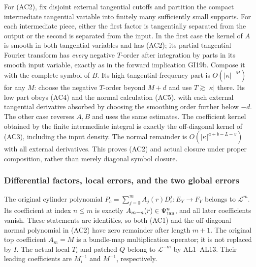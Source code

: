 \documentclass[
  11pt,
]{article}
\begin{document}
For (AC2), fix disjoint external tangential cutoffs and partition the
compact intermediate tangential variable into finitely many sufficiently
small supports. For each intermediate piece, either the first factor is
tangentially separated from the output or the second is separated from
the input. In the first case the kernel of \(A\) is smooth in both
tangential variables and has (AC2); its partial tangential Fourier
transform has \emph{every} negative \(T\)-order after integration by
parts in its smooth input variable, exactly as in the forward
implication GI19b. Compose it with the complete symbol of \(B\). Its
high tangential-frequency part is \(O(|\kappa|^{-M})\) for any \(M\):
choose the negative \(T\)-order beyond \(M+d\) and use
\(T\gtrsim|\kappa|\) there. Its low part obeys (AC4) and the normal
calculation (AC5), with each external tangential derivative absorbed by
choosing the smoothing order further below \(-d\). The other case
reverses \(A,B\) and uses the same estimates. The coefficient kernel
obtained by the finite intermediate integral is exactly the off-diagonal
kernel of (AC3), including the input density. The normal remainder is
\(O(|\kappa|^{a+b-L-v})\) with all external derivatives. This proves
(AC2) and actual closure under proper composition, rather than merely
diagonal symbol closure.

\subsubsection{Differential factors, local errors, and the two global
errors}\label{differential-factors-local-errors-and-the-two-global-errors}

The original cylinder polynomial
\(P_c=\sum_{j=0}^mA_j(r)D_r^j:E_Y\to F_Y\) belongs to \(\mathcal L^m\).
Its coefficient at index \(n\leq m\) is exactly
\(A_{m-n}(r)\in\Psi_{\rm tan}^n\), and all later coefficients vanish.
These statements are identities, so both (AC1) and the off-diagonal
normal polynomial in (AC2) have zero remainder after length \(m+1\). The
original top coefficient \(A_m=M\) is a bundle-map multiplication
operator; it is not replaced by \(I\). The actual local \(T_i\) and
patched \(Q\) belong to \(\mathcal L^{-m}\) by AL1--AL13. Their leading
coefficients are \(M_i^{-1}\) and \(M^{-1}\), respectively.
\end{document}
